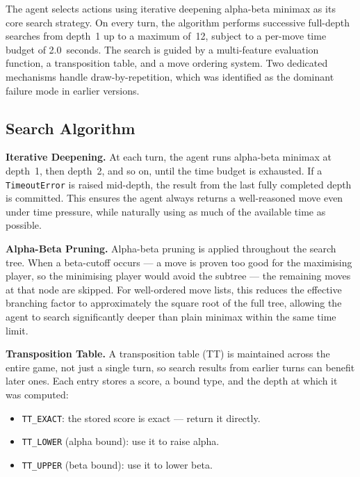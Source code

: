 \documentclass[10.5pt,a4paper]{article}
\begin{document}
The agent selects actions using iterative deepening alpha-beta minimax as its core search strategy. On every turn, the algorithm performs successive full-depth searches from depth~1 up to a maximum of~12, subject to a per-move time budget of 2.0~seconds. The search is guided by a multi-feature evaluation function, a transposition table, and a move ordering system. Two dedicated mechanisms handle draw-by-repetition, which was identified as the dominant failure mode in earlier versions.

\subsection{Search Algorithm}

\textbf{Iterative Deepening.}
At each turn, the agent runs alpha-beta minimax at depth~1, then depth~2, and so on, until the time budget is exhausted. If a \texttt{TimeoutError} is raised mid-depth, the result from the last fully completed depth is committed. This ensures the agent always returns a well-reasoned move even under time pressure, while naturally using as much of the available time as possible.

\textbf{Alpha-Beta Pruning.}
Alpha-beta pruning is applied throughout the search tree. When a beta-cutoff occurs --- a move is proven too good for the maximising player, so the minimising player would avoid the subtree --- the remaining moves at that node are skipped. For well-ordered move lists, this reduces the effective branching factor to approximately the square root of the full tree, allowing the agent to search significantly deeper than plain minimax within the same time limit.

\textbf{Transposition Table.}
A transposition table (TT) is maintained across the entire game, not just a single turn, so search results from earlier turns can benefit later ones. Each entry stores a score, a bound type, and the depth at which it was computed:

\begin{itemize}[noitemsep]
    \item \texttt{TT\_EXACT}: the stored score is exact --- return it directly.
    \item \texttt{TT\_LOWER} (alpha bound): use it to raise alpha.
    \item \texttt{TT\_UPPER} (beta bound): use it to lower beta.
\end{itemize}
\end{document}
